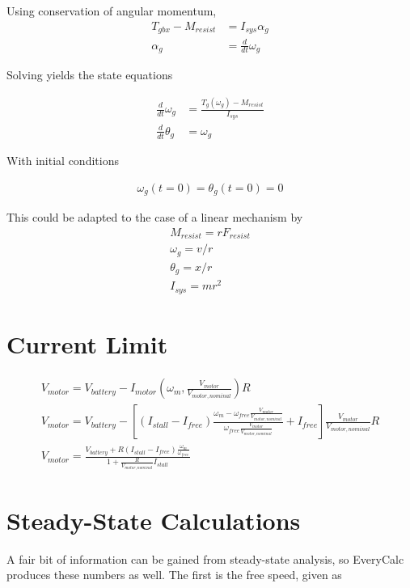 \documentclass[10pt,letterpaper]{article}
\begin{document}
	Using conservation of angular momentum,
	\begin{align}
		T_{gbx} - M_{resist} &= I_{sys} \alpha_{g} \\
		\alpha_{g} &= \frac{d}{dt} \omega_{g}
	\end{align}

	Solving yields the state equations

	\begin{align}
		\frac{d}{dt} \omega_{g} &= \frac{T_{g}(\omega_{g}) - M_{resist}}{I_{sys}} \\
		\frac{d}{dt} \theta_{g} &= \omega_{g}
	\end{align}

	With initial conditions

	\begin{align}
		\omega_g(t=0) = \theta_g(t=0) = 0 
	\end{align}

	This could be adapted to the case of a linear mechanism by
	\begin{align}
		M_{resist} = r F_{resist} \\
		\omega_g   = v / r \\
		\theta_g   = x / r \\
		I_{sys}    = m r^2
	\end{align}

	\section{Current Limit}

	\begin{align}
		V_{motor} = V_{battery} - I_{motor}(\omega_m, \frac{V_{motor}}{V_{motor,nominal}}) R \\
		V_{motor} = V_{battery} - [(I_{stall} - I_{free})\frac{\omega_{m} - \omega_{free}\frac{V_{motor}}{V_{motor,nominal}}}{\omega_{free}\frac{V_{motor}}{V_{motor,nominal}}} + I_{free}] \frac{V_{motor}}{V_{motor,nominal}} R \\
		V_{motor} = \frac{V_{battery} + R (I_{stall}-I_{free}) \frac{\omega_m}{\omega_{free}}}{1 + \frac{R}{V_{motor,nominal}} I_{stall}}
	\end{align}

	\section{Steady-State Calculations}
	A fair bit of information can be gained from steady-state analysis, so EveryCalc produces these numbers as well. The first is the free speed, given as
\end{document}
